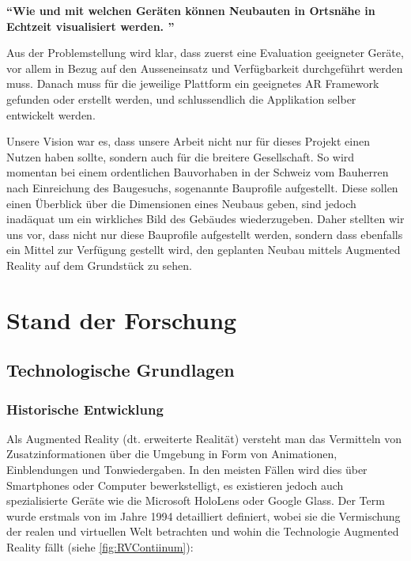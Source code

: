 \documentclass[a4paper]{scrreprt}
\begin{document}
\vspace{1em}

\textbf{\textquotedblleft Wie und mit welchen Geräten können Neubauten in Ortsnähe in Echtzeit visualisiert werden. \textquotedblright}

\vspace{1em}

Aus der Problemstellung wird klar, dass zuerst eine Evaluation geeigneter Geräte, vor allem in Bezug auf den Ausseneinsatz und Verfügbarkeit durchgeführt werden muss. Danach muss für die jeweilige Plattform ein geeignetes AR Framework gefunden oder erstellt werden, und schlussendlich die Applikation selber entwickelt werden.

Unsere Vision war es, dass unsere Arbeit nicht nur für dieses Projekt einen Nutzen haben sollte, sondern auch für die breitere Gesellschaft. So wird momentan bei einem ordentlichen Bauvorhaben in der Schweiz vom Bauherren nach Einreichung des Baugesuchs, sogenannte Bauprofile aufgestellt. Diese sollen einen Überblick über die Dimensionen eines Neubaus geben, sind jedoch inadäquat um ein wirkliches Bild des Gebäudes wiederzugeben. Daher stellten wir uns vor, dass nicht nur diese Bauprofile aufgestellt werden, sondern dass ebenfalls ein Mittel zur Verfügung gestellt wird, den geplanten Neubau mittels Augmented Reality auf dem Grundstück zu sehen.

\chapter{Stand der Forschung}

\section{Technologische Grundlagen}

\subsection{Historische Entwicklung}
Als Augmented Reality (dt. erweiterte Realität) versteht man das Vermitteln von Zusatzinformationen über die Umgebung in Form von Animationen, Einblendungen und Tonwiedergaben. In den meisten Fällen wird dies über Smartphones oder Computer bewerkstelligt, es existieren jedoch auch spezialisierte Geräte wie die Microsoft HoloLens oder Google Glass. Der Term wurde erstmals von \citeauthor{Milgram1994} im Jahre 1994 detailliert definiert, wobei sie die Vermischung der realen und virtuellen Welt betrachten und wohin die Technologie Augmented Reality fällt (siehe \ref{fig:RVContiinum}):
\end{document}
